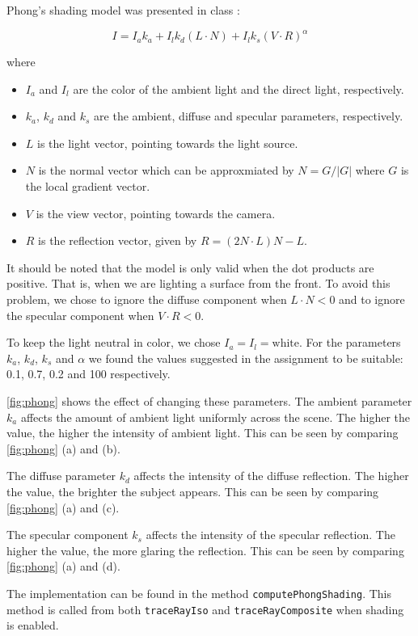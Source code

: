 \documentclass[a4paper]{article}
\begin{document}
Phong's shading model was presented in class \citep{2imv20_2}:

$$I = I_a k_a + I_l k_d(L \cdot N) + I_l k_s(V \cdot R)^\alpha$$

\noindent where

\begin{itemize}
  \item $I_a$ and $I_l$ are the color of the ambient light and the direct light, respectively.
  \item $k_a$, $k_d$ and $k_s$ are the ambient, diffuse and specular parameters, respectively.
  \item $L$ is the light vector, pointing towards the light source.
  \item $N$ is the normal vector which can be approxmiated by $N = {G}/{|G|}$ where $G$ is the local gradient vector.
  \item $V$ is the view vector, pointing towards the camera.
  \item $R$ is the reflection vector, given by $R = (2N \cdot L)N-L$.
\end{itemize}

\noindent It should be noted that the model is only valid when the dot products are positive. That is, when we are lighting a surface from the front. To avoid this problem, we chose to ignore the diffuse component when $L \cdot N < 0$ and to ignore the specular component when $V \cdot R < 0$.

To keep the light neutral in color, we chose $I_a = I_l = \text{white}$. For the parameters $k_a$, $k_d$, $k_s$ and $\alpha$ we found the values suggested in the assignment to be suitable: 0.1, 0.7, 0.2 and 100 respectively.

\autoref{fig:phong} shows the effect of changing these parameters. The ambient parameter $k_a$ affects the amount of ambient light uniformly across the scene. The higher the value, the higher the intensity of ambient light. This can be seen by comparing \autoref{fig:phong} (a) and (b).

The diffuse parameter $k_d$ affects the intensity of the diffuse reflection. The higher the value, the brighter the subject appears. This can be seen by comparing \autoref{fig:phong} (a) and (c).

The specular component $k_s$ affects the intensity of the specular reflection. The higher the value, the more glaring the reflection. This can be seen by comparing \autoref{fig:phong} (a) and (d).

The implementation can be found in the method {\tt computePhongShading}. This method is called from both {\tt traceRayIso} and {\tt traceRayComposite} when shading is enabled.
\end{document}

